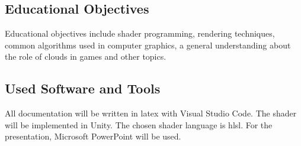 \subsection{Educational Objectives}
Educational objectives include shader programming, rendering techniques, common algorithms used in computer graphics, a general understanding about the role of clouds in games and other topics.

\subsection{Used Software and Tools}
All documentation will be written in \gls{latex} with Visual Studio Code.
The shader will be implemented in Unity. The chosen shader language is \gls{hlsl}.
For the presentation, Microsoft PowerPoint will be used.